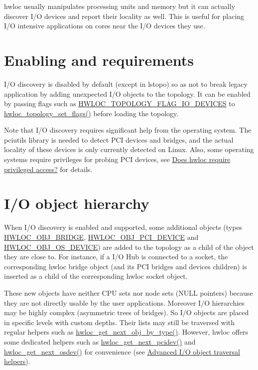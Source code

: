 hwloc usually manipulates processing units and memory but it can actually discover I/O devices and report their locality as well. This is useful for placing I/O intensive applications on cores near the I/O devices they use.\hypertarget{a00005_iodevices_enabling}{}\section{Enabling and requirements}\label{a00005_iodevices_enabling}
I/O discovery is disabled by default (except in lstopo) so as not to break legacy application by adding unexpected I/O objects to the topology. It can be enabled by passing flags such as {\ttfamily \hyperlink{a00044_ggada025d3ec20b4b420f8038d23d6e7bdea46ae25e8896278840b1800ae9ce4de41}{HWLOC\_\-TOPOLOGY\_\-FLAG\_\-IO\_\-DEVICES}} to \hyperlink{a00044_ga6d11e53db143ac39c32cdb3912b71f99}{hwloc\_\-topology\_\-set\_\-flags()} before loading the topology.

Note that I/O discovery requires significant help from the operating system. The pciutils library is needed to detect PCI devices and bridges, and the actual locality of these devices is only currently detected on Linux. Also, some operating systems require privileges for probing PCI devices, see \hyperlink{a00011_faq_privileged}{Does hwloc require privileged access?} for details.\hypertarget{a00005_iodevices_hierarchy}{}\section{I/O object hierarchy}\label{a00005_iodevices_hierarchy}
When I/O discovery is enabled and supported, some additional objects (types {\ttfamily \hyperlink{a00041_ggacd37bb612667dc437d66bfb175a8dc55a6825f10895fea60aca7a6ba9fe273db0}{HWLOC\_\-OBJ\_\-BRIDGE}}, {\ttfamily \hyperlink{a00041_ggacd37bb612667dc437d66bfb175a8dc55a5d8117a54df1fbd3606ab19e42cb0ea9}{HWLOC\_\-OBJ\_\-PCI\_\-DEVICE}} and {\ttfamily \hyperlink{a00041_ggacd37bb612667dc437d66bfb175a8dc55a51e7280240fd9f25589cbbe538bdb075}{HWLOC\_\-OBJ\_\-OS\_\-DEVICE}}) are added to the topology as a child of the object they are close to. For instance, if a I/O Hub is connected to a socket, the corresponding hwloc bridge object (and its PCI bridges and devices children) is inserted as a child of the corresponding hwloc socket object.

These new objects have neither CPU sets nor node sets (NULL pointers) because they are not directly usable by the user applications. Moreover I/O hierarchies may be highly complex (asymmetric trees of bridges). So I/O objects are placed in specific levels with custom depths. Their lists may still be traversed with regular helpers such as \hyperlink{a00053_ga5f08ceb69375341e73563cfe2e77534e}{hwloc\_\-get\_\-next\_\-obj\_\-by\_\-type()}. However, hwloc offers some dedicated helpers such as \hyperlink{a00064_gad6e1ed122ef3b6e098538d75acd5e3f6}{hwloc\_\-get\_\-next\_\-pcidev()} and \hyperlink{a00064_ga73a5bc6265642e6001f7a10812ab886d}{hwloc\_\-get\_\-next\_\-osdev()} for convenience (see \hyperlink{a00064}{Advanced I/O object traversal helpers}).

